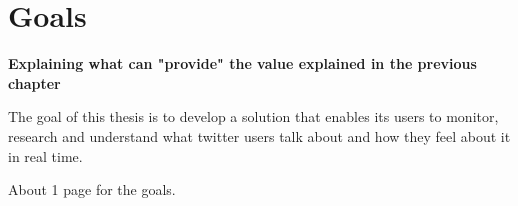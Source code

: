 \chapter{Goals}
\label{ch:goals}

\textbf{Explaining what can "provide" the value explained in the previous chapter}

The goal of this thesis is to develop a solution that enables its users to monitor, research and understand what twitter users talk about and how they feel about it in real time.

About 1 page for the goals.

\pagebreak[1]